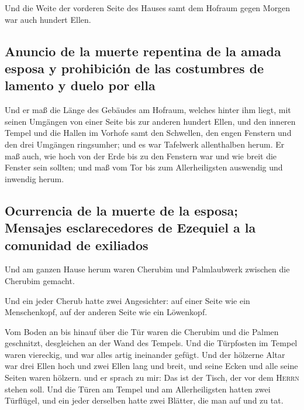 Und die Weite der vorderen Seite des Hauses samt dem
Hofraum gegen Morgen war auch hundert Ellen.

\hypertarget{anuncio-de-la-muerte-repentina-de-la-amada-esposa-y-prohibiciuxf3n-de-las-costumbres-de-lamento-y-duelo-por-ella}{%
\subsection{Anuncio de la muerte repentina de la amada esposa y
prohibición de las costumbres de lamento y duelo por
ella}\label{anuncio-de-la-muerte-repentina-de-la-amada-esposa-y-prohibiciuxf3n-de-las-costumbres-de-lamento-y-duelo-por-ella}}

 Und er maß die Länge des Gebäudes am Hofraum, welches
hinter ihm liegt, mit seinen Umgängen von einer Seite bis zur anderen
hundert Ellen, und den inneren Tempel und die Hallen im Vorhofe
 samt den Schwellen, den engen Fenstern und den drei
Umgängen ringsumher; und es war Tafelwerk allenthalben herum.
 Er maß auch, wie hoch von der Erde bis zu den Fenstern
war und wie breit die Fenster sein sollten; und maß vom Tor bis zum
Allerheiligsten auswendig und inwendig herum.

\hypertarget{ocurrencia-de-la-muerte-de-la-esposa-mensajes-esclarecedores-de-ezequiel-a-la-comunidad-de-exiliados}{%
\subsection{Ocurrencia de la muerte de la esposa; Mensajes
esclarecedores de Ezequiel a la comunidad de
exiliados}\label{ocurrencia-de-la-muerte-de-la-esposa-mensajes-esclarecedores-de-ezequiel-a-la-comunidad-de-exiliados}}

 Und am ganzen Hause herum waren Cherubim und
Palmlaubwerk zwischen die Cherubim gemacht.

 Und ein jeder Cherub hatte zwei Angesichter: auf einer
Seite wie ein Menschenkopf, auf der anderen Seite wie ein Löwenkopf.

 Vom Boden an bis hinauf über die Tür waren die Cherubim
und die Palmen geschnitzt, desgleichen an der Wand des Tempels.
 Und die Türpfosten im Tempel waren viereckig, und war
alles artig ineinander gefügt.  Und der hölzerne Altar
war drei Ellen hoch und zwei Ellen lang und breit, und seine Ecken und
alle seine Seiten waren hölzern. und er sprach zu mir: Das ist der
Tisch, der vor dem \textsc{Herrn} stehen soll.  Und die
Türen am Tempel und am Allerheiligsten  hatten zwei
Türflügel, und ein jeder derselben hatte zwei Blätter, die man auf und
zu tat.

